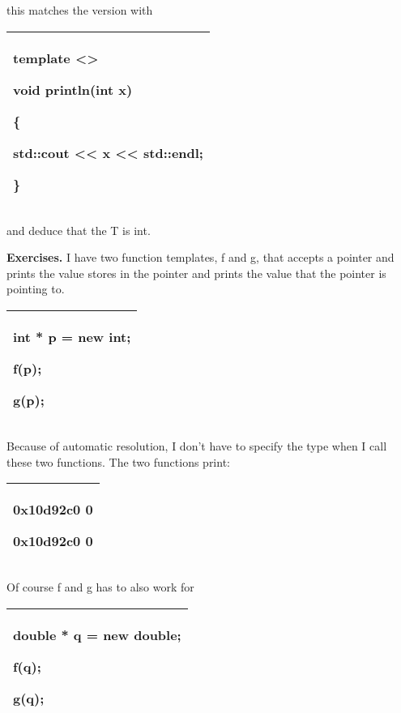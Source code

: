 \documentclass[
]{article}
\begin{document}
this matches the version with

\begin{longtable}[]{@{}l@{}}
\toprule
\endhead
\begin{minipage}[t]{0.97\columnwidth}\raggedright
template \textless\textgreater{}

void println(int x)

\{

std::cout \textless\textless{} x \textless\textless{} std::endl;

\} \strut
\end{minipage}\tabularnewline
\bottomrule
\end{longtable}

and deduce that the T is int.

\textbf{Exercises.} I have two function templates, f and g, that accepts
a pointer and prints the value stores in the pointer and prints the
value that the pointer is pointing to.

\begin{longtable}[]{@{}l@{}}
\toprule
\endhead
\begin{minipage}[t]{0.97\columnwidth}\raggedright
int * p = new int;

f(p);

g(p);\strut
\end{minipage}\tabularnewline
\bottomrule
\end{longtable}

Because of automatic resolution, I don't have to specify the type when I
call these two functions. The two functions print:

\begin{longtable}[]{@{}l@{}}
\toprule
\endhead
\begin{minipage}[t]{0.97\columnwidth}\raggedright
0x10d92c0 0

0x10d92c0 0\strut
\end{minipage}\tabularnewline
\bottomrule
\end{longtable}

Of course f and g has to also work for

\begin{longtable}[]{@{}l@{}}
\toprule
\endhead
\begin{minipage}[t]{0.97\columnwidth}\raggedright
double * q = new double;

f(q);

g(q);\strut
\end{minipage}\tabularnewline
\bottomrule
\end{longtable}
\end{document}
